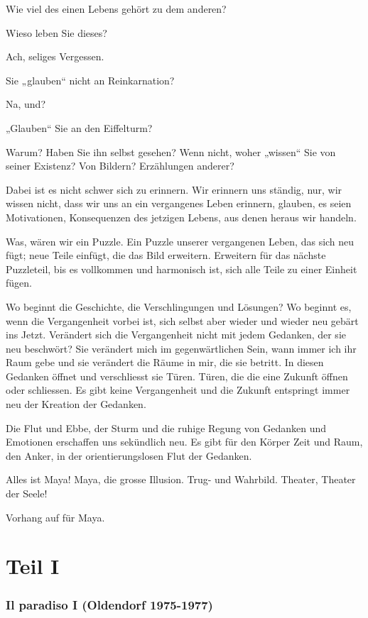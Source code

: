 \documentclass[10pt,titlepage,a5paper]{book}
\begin{document}
Wie viel des einen Lebens gehört zu dem anderen?

Wieso leben Sie dieses?

Ach, seliges Vergessen.

Sie „glauben“ nicht an Reinkarnation?
 
Na, und?

„Glauben“ Sie an den Eiffelturm?

Warum? Haben Sie ihn selbst gesehen? Wenn nicht, woher „wissen“ Sie von seiner Existenz? Von Bildern? Erzählungen anderer?

Dabei ist es nicht schwer sich zu erinnern. Wir erinnern uns ständig, nur, wir wissen nicht, dass wir uns an ein vergangenes Leben erinnern, glauben, es seien Motivationen, Konsequenzen des jetzigen Lebens, aus denen heraus wir handeln.

Was, wären wir ein Puzzle. Ein Puzzle unserer vergangenen Leben, das sich neu fügt; neue Teile einfügt, die das Bild erweitern. Erweitern für das nächste Puzzleteil, bis es vollkommen und harmonisch ist, sich alle Teile zu einer Einheit fügen.

Wo beginnt die Geschichte, die Verschlingungen und Lösungen? Wo beginnt es, wenn die Vergangenheit vorbei ist, sich selbst aber wieder und wieder neu gebärt ins Jetzt. Verändert sich die Vergangenheit nicht mit jedem Gedanken, der sie neu beschwört? Sie verändert mich im gegenwärtlichen Sein, wann immer ich ihr Raum gebe und sie verändert die Räume in mir, die sie betritt. In diesen Gedanken öffnet und verschliesst sie Türen. Türen, die die eine Zukunft öffnen oder schliessen. Es gibt keine Vergangenheit und die Zukunft entspringt immer neu der Kreation der Gedanken.

Die Flut und Ebbe, der Sturm und die ruhige Regung von Gedanken und Emotionen erschaffen uns sekündlich neu. Es gibt für den Körper Zeit und Raum, den Anker, in der orientierungslosen Flut der Gedanken. 

Alles ist Maya! Maya, die grosse Illusion. Trug- und Wahrbild. Theater, Theater der Seele!

Vorhang auf für Maya.



\part*{Teil I}


\section*{Il paradiso I (Oldendorf 1975-1977)}
\end{document}
